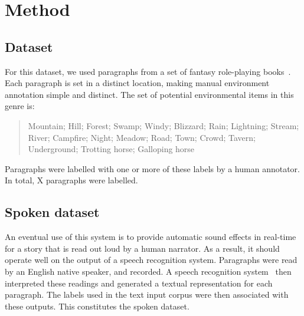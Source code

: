 \documentclass[11pt]{article}
\begin{document}
\section{Method}

\subsection{Dataset}
For this dataset, we used paragraphs from a set of fantasy role-playing books~\cite{fangs,crypt,poe,sswamp}.
Each paragraph is set in a distinct location, making manual environment annotation simple and distinct.
The set of potential environmental items in this genre is:


\begin{quote}
Mountain; Hill; Forest; Swamp; Windy; Blizzard; Rain; Lightning; Stream; River; Campfire; Night; Meadow; Road; Town; Crowd; Tavern; Underground; Trotting horse; Galloping horse
\end{quote}

Paragraphs were labelled with one or more of these labels by a human annotator.
In total, X paragraphs were labelled.

\subsection{Spoken dataset}
An eventual use of this system is to provide automatic sound effects in real-time for a story that is read out loud by a human narrator.
As a result, it should operate well on the output of a speech recognition system.
Paragraphs were read by an English native speaker, and recorded.
A speech recognition system~\cite{lamere2003design} then interpreted these readings and generated a textual representation for each paragraph.
The labels used in the text input corpus were then associated with these outputs.
This constitutes the spoken dataset.
\end{document}
